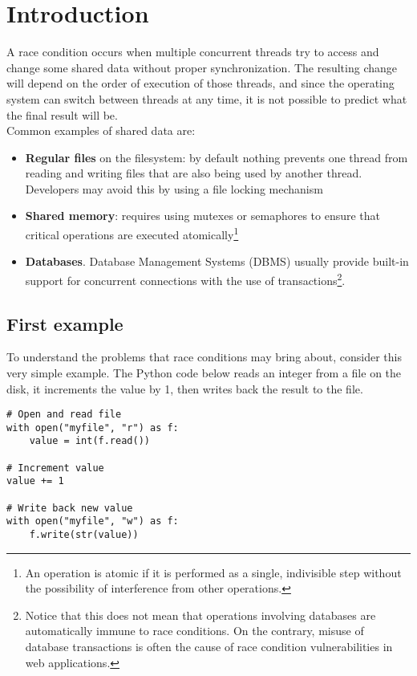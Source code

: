 \section{Introduction}

A race condition occurs when multiple concurrent threads try to access and change some shared data without proper synchronization. The resulting change will depend on the order of execution of those threads, and since the operating system can switch between threads at any time, it is not possible to predict what the final result will be.\\

Common examples of shared data are:
\begin{itemize}
  \item \textbf{Regular files} on the filesystem: by default nothing prevents one thread from reading and writing files that are also being used by another thread. Developers may avoid this by using a file locking mechanism
  \item \textbf{Shared memory}: requires using mutexes or semaphores to ensure that critical operations are executed atomically\footnote{An operation is atomic if it is performed as a single, indivisible step without the possibility of interference from other operations.}
  \item \textbf{Databases}. Database Management Systems (DBMS) usually provide built-in support for concurrent connections with the use of transactions\footnote{Notice that this does not mean that operations involving databases are automatically immune to race conditions. On the contrary, misuse of database transactions is often the cause of race condition vulnerabilities in web applications.}.
\end{itemize}

\subsection{First example}

To understand the problems that race conditions may bring about, consider this very simple example. The Python code below reads an integer from a file on the disk, it increments the value by 1, then writes back the result to the file.

\begin{verbatim}
# Open and read file
with open("myfile", "r") as f:
    value = int(f.read())

# Increment value
value += 1

# Write back new value
with open("myfile", "w") as f:
    f.write(str(value))
\end{verbatim}

